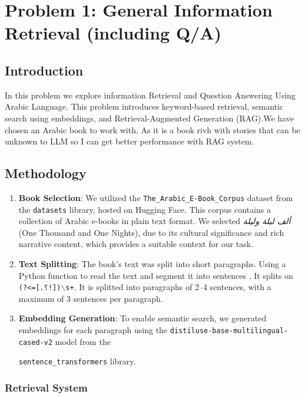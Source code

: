 \documentclass[12pt]{article}
\begin{document}
\section{Problem 1: General Information Retrieval (including Q/A)}

\subsection{Introduction}
In this problem we explore information Retrieval and Question Answering Using Arabic Language. This problem introduces  keyword-based retrieval, semantic search using embeddings, and Retrieval-Augmented Generation (RAG).We have chosen an Arabic book  \arabicfont {} to work with, As it is a book rivh with stories that can be unknown to LLM so I can get better performance with RAG system.

\subsection{Methodology}



\begin{enumerate}
    \item \textbf{Book Selection}: We utilized the \texttt{The\_Arabic\_E-Book\_Corpus} dataset from the \texttt{datasets} library, hosted on Hugging Face. This corpus contains a collection of Arabic e-books in plain text format. We selected \textit{ألف ليلة وليلة} (One Thousand and One Nights), due to its cultural significance and rich narrative content, which provides a suitable context for our task.
    
    \item \textbf{Text Splitting}: The book’s text was split into short paragraphs. Using a Python function to read the text and segment it into sentences , It splits on \texttt{(?<=[.؟!])$\backslash$s+}. It is splitted into paragraphs of 2–4 sentences, with a maximum of 3 sentences per paragraph.
    
    \item \textbf{Embedding Generation}: To enable semantic search, we generated embeddings for each paragraph using the \texttt{distiluse-base-multilingual-cased-v2} model from 
    the
    
    \texttt{sentence\_transformers} library. 

    \end{enumerate}

\subsubsection{Retrieval System}
\end{document}
